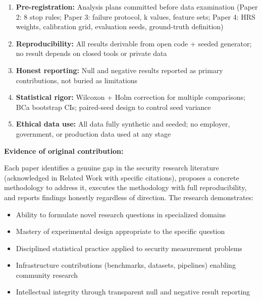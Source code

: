 \documentclass[12pt,letterpaper]{article}
\begin{document}
\begin{enumerate}[leftmargin=*,itemsep=4pt]
  \item \textbf{Pre-registration:} Analysis plans committed before data examination
        (Paper 2: 8 stop rules; Paper 3: failure protocol, k values, feature sets;
        Paper 4: HRS weights, calibration grid, evaluation seeds, ground-truth definition)
  \item \textbf{Reproducibility:} All results derivable from open code + seeded generator;
        no result depends on closed tools or private data
  \item \textbf{Honest reporting:} Null and negative results reported as primary
        contributions, not buried as limitations
  \item \textbf{Statistical rigor:} Wilcoxon + Holm correction for multiple comparisons;
        BCa bootstrap CIs; paired-seed design to control seed variance
  \item \textbf{Ethical data use:} All data fully synthetic and seeded;
        no employer, government, or production data used at any stage
\end{enumerate}

\vspace{1.5em}
\noindent\textbf{Evidence of original contribution:}

Each paper identifies a genuine gap in the security research literature
(acknowledged in Related Work with specific citations), proposes a concrete
methodology to address it, executes the methodology with full reproducibility,
and reports findings honestly regardless of direction. The research demonstrates:

\begin{itemize}[leftmargin=*,itemsep=4pt]
  \item Ability to formulate novel research questions in specialized domains
  \item Mastery of experimental design appropriate to the specific question
  \item Disciplined statistical practice applied to security measurement problems
  \item Infrastructure contributions (benchmarks, datasets, pipelines) enabling community research
  \item Intellectual integrity through transparent null and negative result reporting
\end{itemize}
\end{document}

